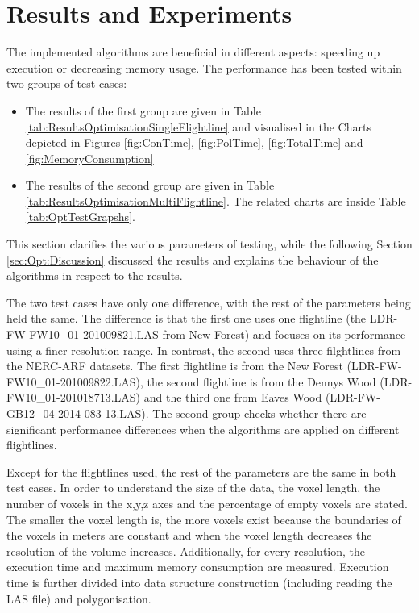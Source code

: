 \documentclass{subfiles}
\begin{document}

\section{Results and Experiments}

\par The implemented algorithms are beneficial in different aspects: speeding up execution or decreasing memory usage. The performance has been tested within two groups of test cases:

\begin{itemize}
	\item The results of the first group are given in Table \ref{tab:ResultsOptimisationSingleFlightline} and visualised in the Charts depicted in Figures \ref{fig:ConTime}, \ref{fig:PolTime}, \ref{fig:TotalTime} and \ref{fig:MemoryConsumption}
	\item The results of the second group are given in Table \ref{tab:ResultsOptimisationMultiFlightline}. The related charts are inside Table \ref{tab:OptTestGrapshs}. 
\end{itemize}
 \par This section clarifies the various parameters of testing, while the following Section \ref{sec:Opt:Discussion} discussed the results and explains the behaviour of the algorithms in respect to the results. 

\par The two test cases have only one difference, with the rest of the parameters being held the same. The difference is that the first one uses one flightline (the LDR-FW-FW10\_01-201009821.LAS from New Forest) and focuses on its performance using a finer resolution range. In contrast, the second uses three filghtlines from the NERC-ARF datasets. The first flightline is from the New Forest (LDR-FW-FW10\_01-201009822.LAS), the second flightline is from the Dennys Wood  (LDR-FW10\_01-201018713.LAS) and the third one from Eaves Wood (LDR-FW-GB12\_04-2014-083-13.LAS). The second group checks whether there are significant performance differences when the algorithms are applied on different flightlines. 

\par Except for the flightlines used, the rest of the parameters are the same in both test cases. In order to understand the size of the data, the voxel length, the number of voxels in the x,y,z axes and the percentage of empty voxels are stated. The smaller the voxel length is, the more voxels exist because the boundaries of the voxels in meters are constant and when the voxel length decreases the resolution of the volume increases. Additionally, for every resolution, the execution time and maximum memory consumption are measured. Execution time is further divided into data structure construction (including reading the LAS file) and polygonisation. 
\end{document}
